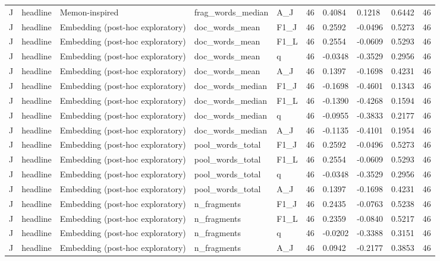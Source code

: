 \begin{table}[t]
{\begin{tabular}{llllllllll}
J & headline & Memon-inspired & frag\_words\_median & A\_J & 46 & 0.4084 & 0.1218 & 0.6442 & 46 \\
J & headline & Embedding (post-hoc exploratory) & doc\_words\_mean & F1\_J & 46 & 0.2592 & -0.0496 & 0.5273 & 46 \\
J & headline & Embedding (post-hoc exploratory) & doc\_words\_mean & F1\_L & 46 & 0.2554 & -0.0609 & 0.5293 & 46 \\
J & headline & Embedding (post-hoc exploratory) & doc\_words\_mean & q & 46 & -0.0348 & -0.3529 & 0.2956 & 46 \\
J & headline & Embedding (post-hoc exploratory) & doc\_words\_mean & A\_J & 46 & 0.1397 & -0.1698 & 0.4231 & 46 \\
J & headline & Embedding (post-hoc exploratory) & doc\_words\_median & F1\_J & 46 & -0.1698 & -0.4601 & 0.1343 & 46 \\
J & headline & Embedding (post-hoc exploratory) & doc\_words\_median & F1\_L & 46 & -0.1390 & -0.4268 & 0.1594 & 46 \\
J & headline & Embedding (post-hoc exploratory) & doc\_words\_median & q & 46 & -0.0955 & -0.3833 & 0.2177 & 46 \\
J & headline & Embedding (post-hoc exploratory) & doc\_words\_median & A\_J & 46 & -0.1135 & -0.4101 & 0.1954 & 46 \\
J & headline & Embedding (post-hoc exploratory) & pool\_words\_total & F1\_J & 46 & 0.2592 & -0.0496 & 0.5273 & 46 \\
J & headline & Embedding (post-hoc exploratory) & pool\_words\_total & F1\_L & 46 & 0.2554 & -0.0609 & 0.5293 & 46 \\
J & headline & Embedding (post-hoc exploratory) & pool\_words\_total & q & 46 & -0.0348 & -0.3529 & 0.2956 & 46 \\
J & headline & Embedding (post-hoc exploratory) & pool\_words\_total & A\_J & 46 & 0.1397 & -0.1698 & 0.4231 & 46 \\
J & headline & Embedding (post-hoc exploratory) & n\_fragments & F1\_J & 46 & 0.2435 & -0.0763 & 0.5238 & 46 \\
J & headline & Embedding (post-hoc exploratory) & n\_fragments & F1\_L & 46 & 0.2359 & -0.0840 & 0.5217 & 46 \\
J & headline & Embedding (post-hoc exploratory) & n\_fragments & q & 46 & -0.0202 & -0.3388 & 0.3151 & 46 \\
J & headline & Embedding (post-hoc exploratory) & n\_fragments & A\_J & 46 & 0.0942 & -0.2177 & 0.3853 & 46 \\

\end{tabular}}
\end{table}
